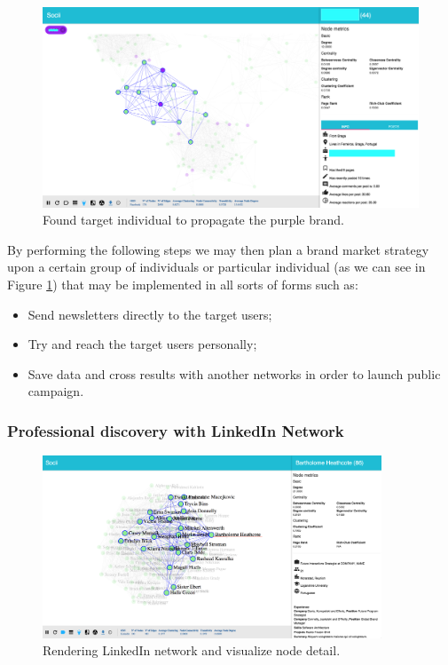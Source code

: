 \begin{figure}[h!]
\begin{center}
  \hspace*{-0.8in}
  \includegraphics[width=1.2\textwidth]{img/socii/socii_14.png}
\end{center}
\caption{\label{img:socii_14} Found target individual to propagate the purple brand.}
\end{figure}

By performing the following steps we may then plan a brand market strategy upon a certain group of individuals or particular individual (as we can see in Figure \ref{img:socii_14}) that may be implemented in all sorts of forms such as:
\begin{itemize}
    \item Send newsletters directly to the target users;
    \item Try and reach the target users personally;
    \item Save data and cross results with another networks in order to launch public campaign.
\end{itemize}

\subsubsection{Professional discovery with LinkedIn Network}

\begin{figure}[h!]
\begin{center}
  \hspace*{-0.8in}
  \includegraphics[width=0.9\textwidth]{img/socii/socii_15.png}
\end{center}
\caption{\label{img:socii_15} Rendering LinkedIn network and visualize node detail.}
\end{figure}

